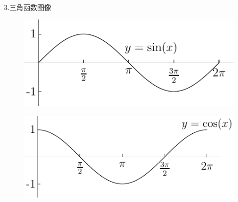 3.三角函数图像
\begin{figure}[H]
\centering
\includegraphics{sin.pdf}
\end{figure}
\begin{figure}[H]
\centering
\includegraphics{cos.pdf}
\end{figure}

